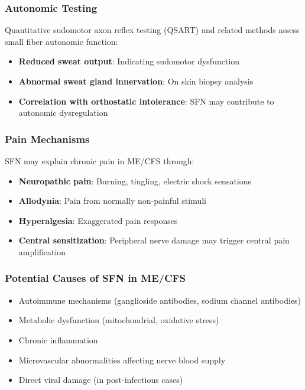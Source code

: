 \subsubsection{Autonomic Testing}

Quantitative sudomotor axon reflex testing (QSART) and related methods assess small fiber autonomic function:

\begin{itemize}
    \item \textbf{Reduced sweat output}: Indicating sudomotor dysfunction
    \item \textbf{Abnormal sweat gland innervation}: On skin biopsy analysis
    \item \textbf{Correlation with orthostatic intolerance}: SFN may contribute to autonomic dysregulation
\end{itemize}

\subsubsection{Pain Mechanisms}

SFN may explain chronic pain in ME/CFS through:

\begin{itemize}
    \item \textbf{Neuropathic pain}: Burning, tingling, electric shock sensations
    \item \textbf{Allodynia}: Pain from normally non-painful stimuli
    \item \textbf{Hyperalgesia}: Exaggerated pain responses
    \item \textbf{Central sensitization}: Peripheral nerve damage may trigger central pain amplification
\end{itemize}

\subsubsection{Potential Causes of SFN in ME/CFS}

\begin{itemize}
    \item Autoimmune mechanisms (ganglioside antibodies, sodium channel antibodies)
    \item Metabolic dysfunction (mitochondrial, oxidative stress)
    \item Chronic inflammation
    \item Microvascular abnormalities affecting nerve blood supply
    \item Direct viral damage (in post-infectious cases)
\end{itemize}

